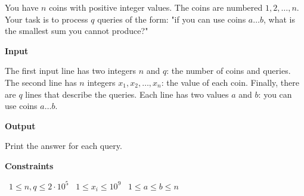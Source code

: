 You have $n$ coins with positive integer values. The coins are numbered $1,2,\dots,n$.
Your task is to process $q$ queries of the form: "if you can use coins $a \dots b$, what is the smallest sum you cannot produce?"

\vspace{0.3cm}\noindent\textbf{Input}

The first input line has two integers $n$ and $q$: the number of coins and queries.
The second line has $n$ integers $x_1,x_2,\dots,x_n$: the value of each coin.
Finally, there are $q$ lines that describe the queries. Each line has two values $a$ and $b$: you can use coins $a \dots b$.

\vspace{0.3cm}\noindent\textbf{Output}

Print the answer for each query.

\vspace{0.3cm}\noindent\textbf{Constraints}

\textbullet\ $1 \le n, q \le 2 \cdot 10^5$
\textbullet\ $1 \le x_i \le 10^9$
\textbullet\ $1 \le a \le b \le n$
